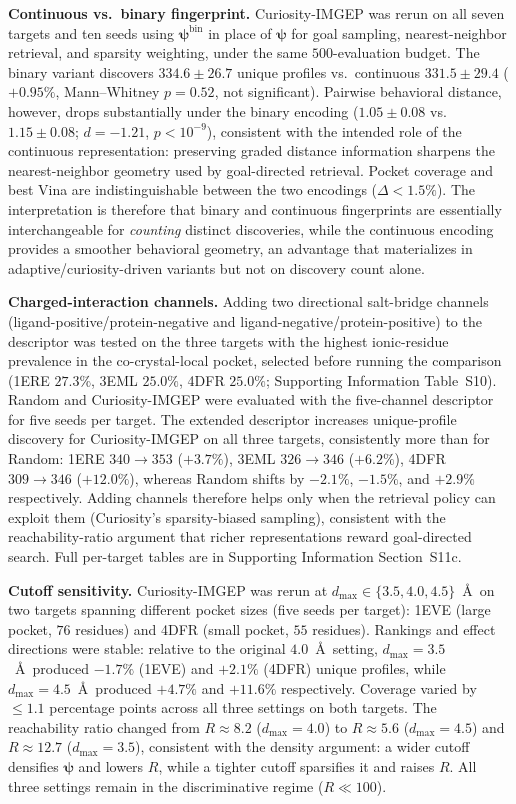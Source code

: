 \documentclass[journal=jcisd8,manuscript=article]{achemso}
\begin{document}
\textbf{Continuous vs.\ binary fingerprint.} Curiosity-IMGEP was rerun on all seven targets and ten seeds using $\boldsymbol{\psi}^{\mathrm{bin}}$ in place of $\boldsymbol{\psi}$ for goal sampling, nearest-neighbor retrieval, and sparsity weighting, under the same $500$-evaluation budget. The binary variant discovers $334.6 \pm 26.7$ unique profiles vs.\ continuous $331.5 \pm 29.4$ ($+0.95\%$, Mann--Whitney $p = 0.52$, not significant). Pairwise behavioral distance, however, drops substantially under the binary encoding ($1.05 \pm 0.08$ vs.\ $1.15 \pm 0.08$; $d = -1.21$, $p < 10^{-9}$), consistent with the intended role of the continuous representation: preserving graded distance information sharpens the nearest-neighbor geometry used by goal-directed retrieval. Pocket coverage and best Vina are indistinguishable between the two encodings (${\Delta}<1.5\%$). The interpretation is therefore that binary and continuous fingerprints are essentially interchangeable for \emph{counting} distinct discoveries, while the continuous encoding provides a smoother behavioral geometry, an advantage that materializes in adaptive/curiosity-driven variants but not on discovery count alone.

\textbf{Charged-interaction channels.} Adding two directional salt-bridge channels (ligand-positive/protein-negative and ligand-negative/protein-positive) to the descriptor was tested on the three targets with the highest ionic-residue prevalence in the co-crystal-local pocket, selected before running the comparison (1ERE $27.3\%$, 3EML $25.0\%$, 4DFR $25.0\%$; Supporting Information Table~S10). Random and Curiosity-IMGEP were evaluated with the five-channel descriptor for five seeds per target. The extended descriptor increases unique-profile discovery for Curiosity-IMGEP on all three targets, consistently more than for Random: 1ERE $340 \to 353$ ($+3.7\%$), 3EML $326 \to 346$ ($+6.2\%$), 4DFR $309 \to 346$ ($+12.0\%$), whereas Random shifts by $-2.1\%$, $-1.5\%$, and $+2.9\%$ respectively. Adding channels therefore helps only when the retrieval policy can exploit them (Curiosity's sparsity-biased sampling), consistent with the reachability-ratio argument that richer representations reward goal-directed search. Full per-target tables are in Supporting Information Section~S11c.

\textbf{Cutoff sensitivity.} Curiosity-IMGEP was rerun at $d_{\max} \in \{3.5, 4.0, 4.5\}$~\AA\ on two targets spanning different pocket sizes (five seeds per target): 1EVE (large pocket, $76$ residues) and 4DFR (small pocket, $55$ residues). Rankings and effect directions were stable: relative to the original $4.0$~\AA\ setting, $d_{\max}=3.5$~\AA\ produced $-1.7\%$ (1EVE) and $+2.1\%$ (4DFR) unique profiles, while $d_{\max}=4.5$~\AA\ produced $+4.7\%$ and $+11.6\%$ respectively. Coverage varied by $\leq 1.1$ percentage points across all three settings on both targets. The reachability ratio changed from $R \approx 8.2$ ($d_{\max}=4.0$) to $R \approx 5.6$ ($d_{\max}=4.5$) and $R \approx 12.7$ ($d_{\max}=3.5$), consistent with the density argument: a wider cutoff densifies $\boldsymbol{\psi}$ and lowers $R$, while a tighter cutoff sparsifies it and raises $R$. All three settings remain in the discriminative regime ($R \ll 100$).
\end{document}
